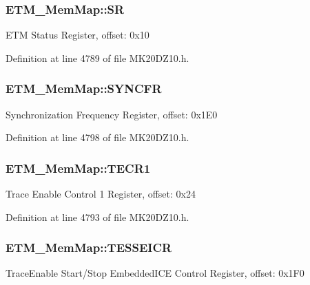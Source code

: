 \subsubsection[{\texorpdfstring{SR}{SR}}]{ E\+T\+M\+\_\+\+Mem\+Map\+::\+SR}\hypertarget{struct_e_t_m___mem_map_af91fa67ecfbfa6eb2d20588bbf32215b}{}\label{struct_e_t_m___mem_map_af91fa67ecfbfa6eb2d20588bbf32215b}
E\+TM Status Register, offset\+: 0x10 

Definition at line 4789 of file M\+K20\+D\+Z10.\+h.

\subsubsection[{\texorpdfstring{S\+Y\+N\+C\+FR}{SYNCFR}}]{ E\+T\+M\+\_\+\+Mem\+Map\+::\+S\+Y\+N\+C\+FR}\hypertarget{struct_e_t_m___mem_map_af01a13d412cdc4037d95e27ac51c64bd}{}\label{struct_e_t_m___mem_map_af01a13d412cdc4037d95e27ac51c64bd}
Synchronization Frequency Register, offset\+: 0x1\+E0 

Definition at line 4798 of file M\+K20\+D\+Z10.\+h.

\subsubsection[{\texorpdfstring{T\+E\+C\+R1}{TECR1}}]{ E\+T\+M\+\_\+\+Mem\+Map\+::\+T\+E\+C\+R1}\hypertarget{struct_e_t_m___mem_map_a190e1e7ffbcf9b1b6c6d543aa4e1fbc4}{}\label{struct_e_t_m___mem_map_a190e1e7ffbcf9b1b6c6d543aa4e1fbc4}
Trace Enable Control 1 Register, offset\+: 0x24 

Definition at line 4793 of file M\+K20\+D\+Z10.\+h.

\subsubsection[{\texorpdfstring{T\+E\+S\+S\+E\+I\+CR}{TESSEICR}}]{ E\+T\+M\+\_\+\+Mem\+Map\+::\+T\+E\+S\+S\+E\+I\+CR}\hypertarget{struct_e_t_m___mem_map_a81f0d20c0c8efb46c6c06bcc30c5947e}{}\label{struct_e_t_m___mem_map_a81f0d20c0c8efb46c6c06bcc30c5947e}
Trace\+Enable Start/\+Stop Embedded\+I\+CE Control Register, offset\+: 0x1\+F0 

